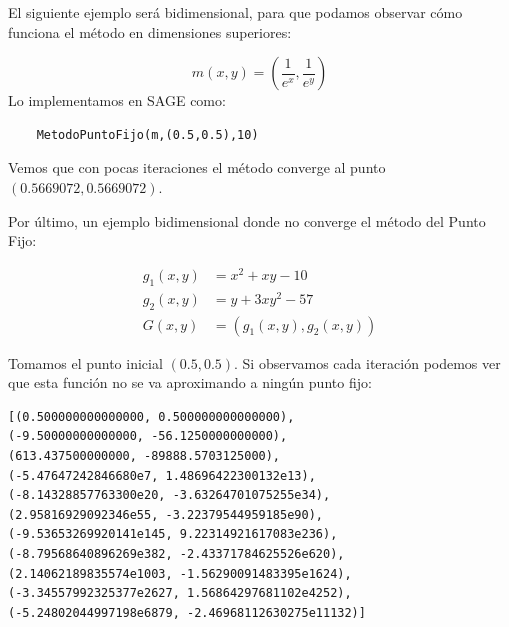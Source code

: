 El siguiente ejemplo será bidimensional, para que podamos observar cómo funciona el método en dimensiones superiores:

\begin{example}
	$$m(x,y) = (\frac{1}{e^{x}},\frac{1}{e^{y}})$$
Lo implementamos en SAGE como:
\begin{verbatim}
	MetodoPuntoFijo(m,(0.5,0.5),10)
\end{verbatim}

Vemos que con pocas iteraciones el método converge al punto $(0.5669072, 0.5669072)$.

\end{example}

Por último, un ejemplo bidimensional donde no converge el método del Punto Fijo:
\begin{example}
$$
\begin{matrix}
	g_1(x,y) & = x^2+xy-10 \\
	g_2(x,y) & = y + 3xy^2 - 57 \\
	G(x,y)   & = (g_1(x,y),g_2(x,y))
\end{matrix}
$$

Tomamos el punto inicial $(0.5,0.5)$. Si observamos cada iteración podemos ver que esta función no se va aproximando a ningún punto fijo:

\begin{verbatim}
[(0.500000000000000, 0.500000000000000),
(-9.50000000000000, -56.1250000000000),
(613.437500000000, -89888.5703125000),
(-5.47647242846680e7, 1.48696422300132e13),
(-8.14328857763300e20, -3.63264701075255e34),
(2.95816929092346e55, -3.22379544959185e90),
(-9.53653269920141e145, 9.22314921617083e236),
(-8.79568640896269e382, -2.43371784625526e620),
(2.14062189835574e1003, -1.56290091483395e1624),
(-3.34557992325377e2627, 1.56864297681102e4252),
(-5.24802044997198e6879, -2.46968112630275e11132)]
\end{verbatim}

	
\end{example}
                                           
%

